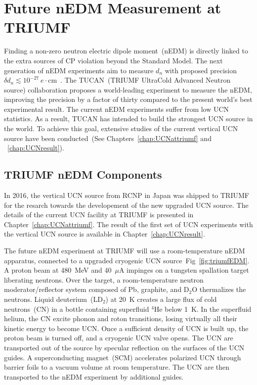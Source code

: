 \chapter{Future nEDM Measurement at TRIUMF\label{chap:nedm}}

Finding a non-zero neutron electric dipole moment~(nEDM) is directly
linked to the extra sources of CP violation beyond the Standard Model.
The next generation of nEDM experiments aim to measure $d_n$ with
proposed precision
$\delta d_n\lesssim
10^{-27}~e\cdot$cm~\cite{serebrov2014new,serebrov2011supersource,Kirch_talk,baker2011search,altarev2012next,golub1994neutron,ito2007plans,picker2017minuscule}.
The TUCAN~(TRIUMF UltraCold Advanced Neutron source) collaboration
proposes a world-leading experiment to measure the nEDM, improving the
precision by a factor of thirty compared to the present world’s best
experimental result. The current nEDM experiments suffer from low UCN
statistics. As a result, TUCAN has intended to build the strongest UCN
source in the world. To achieve this goal, extensive studies of the
current vertical UCN source have been conducted~(See
Chapters~\ref{chap:UCNattriumf} and ~\ref{chap:UCNresult}).



\section{TRIUMF nEDM Components~\label{sec:triumfnedm}}
In 2016, the vertical UCN source from RCNP in Japan was shipped to
TRIUMF for the resarch towards the developement of the new upgraded
UCN source.  The details of the current UCN facility at TRIUMF is
presented in Chapter~\ref{chap:UCNattriumf}. The result of the first
set of UCN experiments with the vertical UCN source is available in
Chapter~\ref{chap:UCNresult}.



The future nEDM experiment at TRIUMF will use a room-temperature nEDM
apparatus, connected to a upgraded cryogenic UCN
source~Fig~\ref{fig:triumfEDM}. A proton beam at 480~MeV and
40~$\mu$A impinges on a tungsten spallation target liberating
neutrons. Over the target, a room-temperature neutron
moderator/reflector system composed of Pb, graphite, and D$_2$O
thermalizes the neutrons. Liquid deuterium~(LD$_2$) at 20~K creates a
large flux of cold neutrons~(CN) in a bottle containing superfluid
$^4$He below 1~K. In the superfluid helium, the CN excite phonon and
roton transitions, losing virtually all their kinetic energy to become
UCN. Once a sufficient density of UCN is built up, the proton beam is
turned off, and a cryogenic UCN valve opens. The UCN are transported
out of the source by specular reflection on the surfaces of the UCN
guides. A superconducting magnet~(SCM) accelerates polarized UCN
through barrier foils to a vacuum volume at room temperature. The UCN
are then transported to the nEDM experiment by additional guides.



